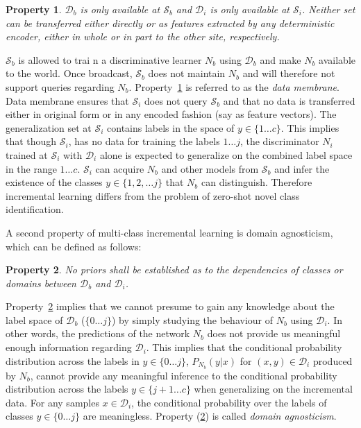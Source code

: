 \documentclass[10pt,twocolumn,letterpaper]{article}
\newtheorem{property}{Property}
\def \cS{{\mathcal{S}}}
\def \cD{{\mathcal{D}}}
\begin{document}
	\begin{property}
		\label{prop:membrane}
		$\cD_b$ is only available at $\cS_b$ and  $\cD_i$ is only available at $\cS_i$. 
		Neither set can be transferred either directly or as features extracted by any deterministic encoder, either in whole or in part to the other site, respectively. 
	\end{property}
	$\cS_b$ is allowed to trai n a discriminative learner $N_b$ using $\cD_b$ and make $N_b$ available to the world. 
	Once broadcast, $\cS_b$ does not maintain $N_b$ and will therefore not support queries regarding $N_b$. Property~\ref{prop:membrane} is referred to as the \emph{data membrane}. 
	Data membrane ensures that $\cS_i$ does not query $\cS_b$ and that no data is transferred either in original form or in any encoded fashion (say as feature vectors). 
	The generalization set at $\cS_i$ contains labels in the space of  $y \in\{1 \hdots c\}$. 
	This implies that though $\cS_i$, has no data for training the labels $1 \hdots j$, the discriminator $N_i$ trained at $\cS_i$ with $\cD_i$ alone is expected to generalize on the combined label space in the range $1 \hdots c$. 
	$\cS_i$ can acquire $N_b$ and other models from $\cS_b$ and infer the existence of the classes $y \in \{1,2, \hdots j\}$ that $N_b$ can distinguish. Therefore incremental learning differs from the problem of zero-shot novel class identification.
	
	A second property of multi-class incremental learning is domain agnosticism, which can be defined as follows:	
	\begin{property}
		\label{prop:agnostic}
		No priors shall be established as to the dependencies of classes or domains between $\cD_b$ and $\cD_i$. 
	\end{property}
	Property~\ref{prop:agnostic} implies that we cannot presume to gain any knowledge about the label space of $\cD_b$ ($\{0 \hdots j\}$) by simply studying the behaviour of $N_b$ using $\cD_i$.
	In other words, the predictions of the network $N_b$ does not provide us meaningful enough information regarding $\cD_i$. 
	This implies that the conditional probability distribution across the labels in $y \in \{0 \hdots j\}$, $P_{N_b}(y|x)$ for $(x,y)\in\cD_i$ produced by $N_b$, cannot provide any meaningful inference to the conditional probability distribution across the labels $y \in \{j+1 \hdots c\}$ when generalizing on the incremental data. 
	For any samples $x \in \cD_i$, the conditional probability over the labels of classes $y \in \{0 \hdots j\}$ are meaningless. 
	Property (\ref{prop:agnostic}) is called \emph{domain agnosticism}. 
	
\end{document}
